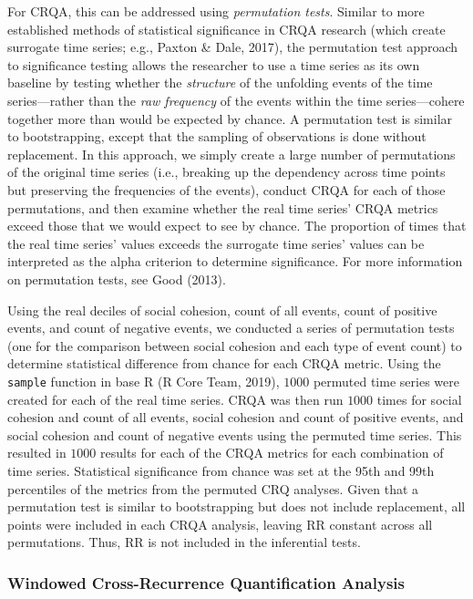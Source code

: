 \documentclass[english,man]{apa6}
\begin{document}
For CRQA, this can be addressed using \emph{permutation tests}. Similar to more
established methods of statistical significance in CRQA research (which create
surrogate time series; e.g., Paxton \& Dale, 2017), the permutation test
approach to significance testing allows the researcher to use a time series as
its own baseline by testing whether the \emph{structure} of the unfolding events of
the time series---rather than the \emph{raw frequency} of the events within the time
series---cohere together more than would be expected by chance. A permutation
test is similar to bootstrapping, except that the sampling of observations is
done without replacement. In this approach, we simply create a large number of
permutations of the original time series (i.e., breaking up the dependency
across time points but preserving the frequencies of the events), conduct CRQA
for each of those permutations, and then examine whether the real time series'
CRQA metrics exceed those that we would expect to see by chance. The proportion
of times that the real time series' values exceeds the surrogate time series'
values can be interpreted as the alpha criterion to determine significance. For
more information on permutation tests, see Good (2013).

Using the real deciles of social cohesion, count of all events, count of
positive events, and count of negative events, we conducted a series of
permutation tests (one for the comparison between social cohesion and each type
of event count) to determine statistical difference from chance for each CRQA
metric. Using the \texttt{sample} function in base R (R Core Team, 2019), \(1000\) permuted time
series were created for each of the real time series. CRQA was then run \(1000\)
times for social cohesion and count of all events, social cohesion and count of
positive events, and social cohesion and count of negative events using the
permuted time series. This resulted in \(1000\) results for each of the CRQA
metrics for each combination of time series. Statistical significance from
chance was set at the 95th and 99th percentiles of the metrics from the permuted
CRQ analyses. Given that a permutation test is similar to bootstrapping but does
not include replacement, all points were included in each CRQA analysis, leaving
RR constant across all permutations. Thus, RR is not included in the inferential
tests.

\hypertarget{windowed-cross-recurrence-quantification-analysis}{%
\subsubsection{Windowed Cross-Recurrence Quantification Analysis}\label{windowed-cross-recurrence-quantification-analysis}}
\end{document}

